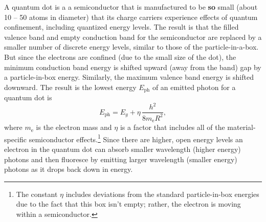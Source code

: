 A quantum dot is a a semiconductor that is manufactured to be
{\bf so} small (about 10 -- 50 atoms in diameter) that its charge
carriers experience effects of quantum confinement, including
quantized energy levels. The result is that the filled valence band
and empty conduction band for the semiconductor are replaced by a smaller
number of discrete energy levels, similar to those of the particle-in-a-box.
But since the electrons are confined
(due to the small size of the dot), the minimum conduction band energy
is shifted upward (away from the band) gap by a particle-in-box energy.
Similarly, the maximum valence band energy is shifted downward.
The result is the lowest energy $E_\text{ph}$ of an emitted photon for a 
quantum dot is
\begin{equation}
E_\text{ph}=E_g+\eta\, \frac{h^2}{8m_\text{e}R^2} , 
\label{eq:QDot}
\end{equation}
where $m_\text{e}$ is the electron
mass and $\eta$ is a factor that includes all of the material-specific 
semiconductor effects.\footnote{The constant $\eta$ includes deviations
from the standard particle-in-box energies due to the fact that this box
isn't empty; rather, the electron is moving within a semiconductor.}
Since there are higher, open energy levels an electron in the quantum 
dot can absorb smaller wavelength (higher energy) photons and then 
fluoresce by emitting larger wavelength (smaller energy) photons 
as it drops back down in energy.

